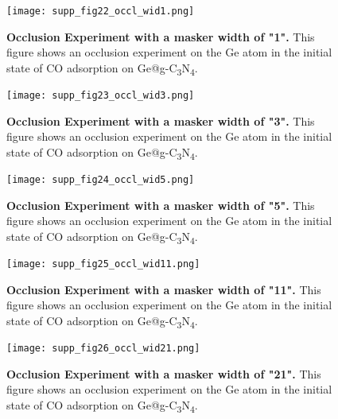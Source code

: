\begin{figure}[htbp]
  \centering
  \texttt{[image: supp\_fig22\_occl\_wid1.png]}
  \caption{\textbf{Occlusion Experiment with a masker width of "1".}
  This figure shows an occlusion experiment on the Ge atom in
  the initial state of CO adsorption on Ge@g-C\textsubscript{3}N\textsubscript{4}.}
  \label{supp_fig22:occl_wid1}
\end{figure}

\begin{figure}[htbp]
  \centering
  \texttt{[image: supp\_fig23\_occl\_wid3.png]}
  \caption{\textbf{Occlusion Experiment with a masker width of "3".}
  This figure shows an occlusion experiment on the Ge atom in
  the initial state of CO adsorption on Ge@g-C\textsubscript{3}N\textsubscript{4}.}
  \label{supp_fig23:occl_wid3}
\end{figure}

\begin{figure}[htbp]
  \centering
  \texttt{[image: supp\_fig24\_occl\_wid5.png]}
  \caption{\textbf{Occlusion Experiment with a masker width of "5".}
  This figure shows an occlusion experiment on the Ge atom in
  the initial state of CO adsorption on Ge@g-C\textsubscript{3}N\textsubscript{4}.}
  \label{supp_fig24:occl_wid5}
\end{figure}

\begin{figure}[htbp]
  \centering
  \texttt{[image: supp\_fig25\_occl\_wid11.png]}
  \caption{\textbf{Occlusion Experiment with a masker width of "11".}
  This figure shows an occlusion experiment on the Ge atom in
  the initial state of CO adsorption on Ge@g-C\textsubscript{3}N\textsubscript{4}.}
  \label{supp_fig25:occl_wid11}
\end{figure}

\begin{figure}[htbp]
  \centering
  \texttt{[image: supp\_fig26\_occl\_wid21.png]}
  \caption{\textbf{Occlusion Experiment with a masker width of "21".}
  This figure shows an occlusion experiment on the Ge atom in
  the initial state of CO adsorption on Ge@g-C\textsubscript{3}N\textsubscript{4}.}
  \label{supp_fig26:occl_wid21}
\end{figure}

